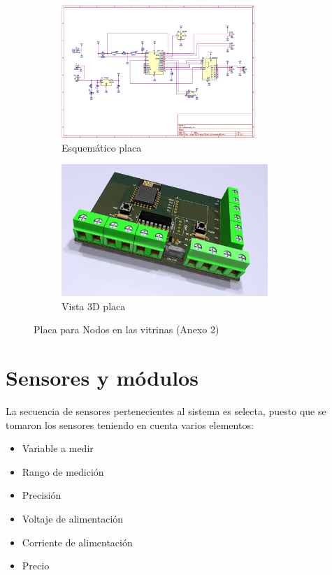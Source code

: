     \begin{figure}[H]
        \centering
        \begin{subfigure}[b]{0.45\linewidth}
        \includegraphics[width=\linewidth, height=5cm]{imagenes/esquematico nodo.jpg}
        \caption{Esquemático placa}
        \label{imag:esquematico_placa}
    \end{subfigure}
    \begin{subfigure}[b]{0.45\linewidth}
        \includegraphics[width=\linewidth, height=5cm]{imagenes/vista 3D.jpg}
        \caption{Vista 3D placa}
        \label{imag:vista3D_placa}
    \end{subfigure}
        \caption{Placa para Nodos en las vitrinas (Anexo 2)}
        \label{imag:placa_impresa}
    \end{figure}


\section{Sensores y módulos} \label{sec:sensores}

    La secuencia de sensores pertenecientes al sistema es selecta, puesto que se tomaron los sensores teniendo en cuenta varios elementos:

    \begin{itemize}
        \item Variable a medir
        \item Rango de medición
        \item Precisión
        \item Voltaje de alimentación
        \item Corriente de alimentación
        \item Precio
    \end{itemize}

